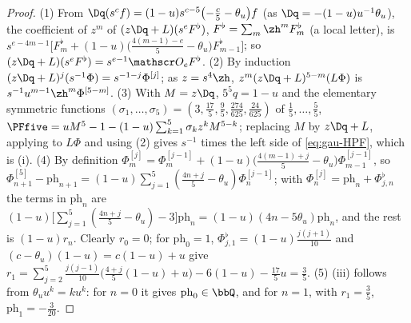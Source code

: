 \begin{proof}
(1) From $\Dq(s^cf)=(1-u)s^{c-5}\bigl(-\frac c5-\theta_u\bigr)f$ (as $\Dq=-(1-u)u^{-1}\theta_u$), the coefficient of $z^m$ of $(z\Dq+L)(s^eF^\flat)$, $F^\flat=\sum_m\zh^mF^\flat_m$ (a local letter), is $s^{e-4m-1}\bigl[F^\flat_m+(1-u)\bigl(\frac{4(m-1)-e}5-\theta_u\bigr)F^\flat_{m-1}\bigr]$; so $(z\Dq+L)(s^eF^\flat)=s^{e-1}\mathscr O_eF^\flat$. (2) By induction $(z\Dq+L)^j(s^{-1}\Phi)=s^{-1-j}\Phi^{[j]}$; as $z=s^4\zh$, $z^m(z\Dq+L)^{5-m}(L\Phi)$ is $s^{-1}u^{m-1}\zh^m\Phi^{[5-m]}$. (3) With $M=z\Dq$, $5^5q=1-u$ and the elementary symmetric functions $(\sigma_1,\dots,\sigma_5)=(3,\frac{17}5,\frac95,\frac{274}{625},\frac{24}{625})$ of $\frac15,\dots,\frac55$, $\PFfive=uM^5-1-(1-u)\sum_{k=1}^5\sigma_kz^kM^{5-k}$; replacing $M$ by $z\Dq+L$, applying to $L\Phi$ and using (2) gives $s^{-1}$ times the left side of \eqref{eq:gau-HPF}, which is (i).
(4) By definition $\Phi^{[j]}_m=\Phi^{[j-1]}_m+(1-u)\bigl(\frac{4(m-1)+j}5-\theta_u\bigr)\Phi^{[j-1]}_{m-1}$, so $\Phi^{[5]}_{n+1}-\mathrm{ph}_{n+1}=(1-u)\sum_{j=1}^5(\frac{4n+j}5-\theta_u)\Phi^{[j-1]}_n$; with $\Phi^{[j]}_n=\mathrm{ph}_n+\Phi^\flat_{j,n}$ the terms in $\mathrm{ph}_n$ are $(1-u)\bigl[\sum_{j=1}^5(\frac{4n+j}5-\theta_u)-3\bigr]\mathrm{ph}_n=(1-u)(4n-5\theta_u)\mathrm{ph}_n$, and the rest is $(1-u)r_n$. Clearly $r_0=0$; for $\mathrm{ph}_0=1$, $\Phi^\flat_{j,1}=(1-u)\frac{j(j+1)}{10}$ and $(c-\theta_u)(1-u)=c(1-u)+u$ give $r_1=\sum_{j=2}^5\frac{j(j-1)}{10}\bigl(\frac{4+j}5(1-u)+u\bigr)-6(1-u)-\frac{17}5u=\frac35$.
(5) (iii) follows from $\theta_uu^k=ku^k$: for $n=0$ it gives $\mathrm{ph}_0\in\bbQ$, and for $n=1$, with $r_1=\frac35$, $\mathrm{ph}_1=-\frac3{20}$.
\end{proof}


